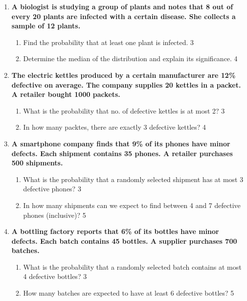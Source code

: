 \documentclass[a4paper,oneside]{book}
\begin{document}
\begin{enumerate}
\begin{enumerate}
		[Hint: For a binomial distribution, $\gamma_1 = \frac{q-p}{\sqrt{npq}}$]
  \end{enumerate}
  
  \item
	  \textbf{A biologist is studying a group of plants and notes that 8 out of every 20 plants are infected with a certain disease. She collects a sample of 12 plants.} 
  
  \begin{enumerate}
    \item  
	Find the probability that at least one plant is infected. \hfill 3
    \item
	Determine the median of the distribution and explain its significance. \hfill 4
  \end{enumerate}


 \item
	  \textbf{The electric kettles produced by a certain manufacturer are 12\% 
	  defective on average. The company supplies 20 kettles in a packet. A retailer
	  bought 1000 packets.} 
  
  \begin{enumerate}
    \item  
	What is the probability that no. of defective kettles is at most 2? \hfill 3
    \item
	In how many packtes, there are exactly 3 defective kettles? \hfill 4
  \end{enumerate}
  
  \item  
  \textbf{A smartphone company finds that 9\% of its phones have minor defects. Each shipment contains 35 phones. A retailer purchases 500 shipments.}  

  \begin{enumerate}  
    \item  
      What is the probability that a randomly selected shipment has at most 3 defective phones? \hfill 3  
    \item  
      In how many shipments can we expect to find between 4 and 7 defective phones (inclusive)? \hfill 5  
  \end{enumerate}  

\item  
  \textbf{A bottling factory reports that 6\% of its bottles have minor defects. Each batch contains 45 bottles. A supplier purchases 700 batches.}  

  \begin{enumerate}  
    \item  
      What is the probability that a randomly selected batch contains at most 4 defective bottles? \hfill 3  
    \item  
      How many batches are expected to have at least 6 defective bottles? \hfill 5  
  \end{enumerate}  


\end{enumerate}
\end{document}
